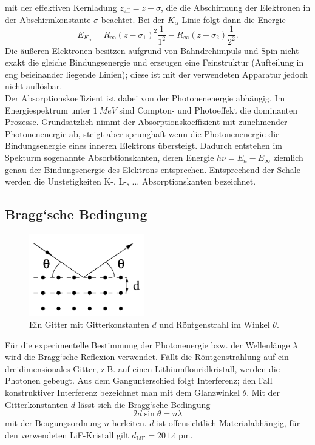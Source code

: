 mit der effektiven Kernladung $z_\text{eff} = z - \sigma$, die die Abschirmung der
Elektronen in der Abschirmkonstante $\sigma$ beachtet. Bei der $K_\alpha$-Linie folgt dann
die Energie
\begin{equation}
	E_{K_\alpha} = R_\infty (z - \sigma_1)^2 \frac{1}{1^2} - R_\infty (z - \sigma_2)
	\frac{1}{2^2}.
\end{equation}
Die äußeren Elektronen besitzen aufgrund von Bahndrehimpuls und Spin nicht exakt die
gleiche Bindungsenergie und erzeugen eine Feinstruktur (Aufteilung in eng beieinander
liegende Linien); diese ist mit der verwendeten Apparatur jedoch nicht auflösbar.
\\
Der Absorptionskoeffizient ist dabei von der Photonenenergie abhängig. Im Energiespektrum
unter $\SI{1}{MeV}$ sind Compton- und Photoeffekt die dominanten Prozesse. Grundsätzlich
nimmt der Absorptionskoeffizient mit zunehmender Photonenenergie ab, steigt aber
sprunghaft wenn die Photonenenergie die Bindungsenergie eines inneren Elektrons
übersteigt. Dadurch entstehen im Spekturm sogenannte Absorbtionskanten, deren Energie
$h\nu = E_n - E_\infty$ ziemlich genau der Bindungsenergie des Elektrons entsprechen.
Entsprechend der Schale werden die Unstetigkeiten K-, L-, $\hdots$ Absorptionskanten
bezeichnet.

\subsection{Bragg`sche Bedingung}
\label{sec:Bragg`sche Bedingung}
\begin{figure}
	\begin{center}
		\includegraphics[width=5cm]{images/gitter.png}
	\caption{Ein Gitter mit Gitterkonstanten $d$ und Röntgenstrahl im Winkel
	$\theta$. \cite{V602}}
	\end{center}
	\label{fig:gitter}
\end{figure}
Für die experimentelle Bestimmung der Photonenergie bzw. der Wellenlänge $\lambda$ wird
die Bragg`sche Reflexion verwendet. Fällt die Röntgenstrahlung auf ein
dreidimensionales Gitter, z.B. auf einen Lithiumflouridkristall, werden die Photonen
gebeugt. Aus dem Gangunterschied folgt Interferenz; den Fall konstruktiver Interferenz
bezeichnet man mit dem Glanzwinkel $\theta$. Mit der Gitterkonstanten $d$ lässt sich die
Bragg`sche Bedingung
\begin{equation}
	2d \sin\theta = n\lambda
	\label{eqn:braggsche-bedingung}
\end{equation}
mit der Beugungsordnung $n$ herleiten. $d$ ist offensichtlich Materialabhängig, für den
verwendeten LiF-Kristall gilt $d_\text{LiF} = \SI{201.4}{\pm}$.

